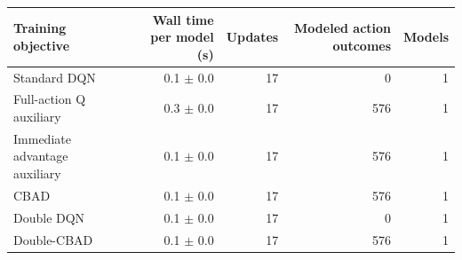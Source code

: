 \begin{tabular}{lrrrr}
\toprule
Training objective & Wall time per model (s) & Updates & Modeled action outcomes & Models \\
\midrule
Standard DQN & 0.1 $\pm$ 0.0 & 17 & 0 & 1 \\
Full-action Q auxiliary & 0.3 $\pm$ 0.0 & 17 & 576 & 1 \\
Immediate advantage auxiliary & 0.1 $\pm$ 0.0 & 17 & 576 & 1 \\
CBAD & 0.1 $\pm$ 0.0 & 17 & 576 & 1 \\
Double DQN & 0.1 $\pm$ 0.0 & 17 & 0 & 1 \\
Double-CBAD & 0.1 $\pm$ 0.0 & 17 & 576 & 1 \\
\bottomrule
\end{tabular}